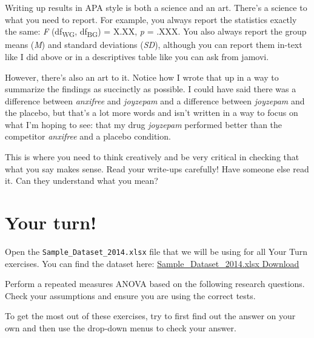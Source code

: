 \documentclass[
]{book}
\begin{document}
Writing up results in APA style is both a science and an art. There's a science to what you need to report. For example, you always report the statistics exactly the same: \emph{F} (df\textsubscript{WG}, df\textsubscript{BG}) = X.XX, \emph{p} = .XXX. You also always report the group means (\emph{M}) and standard deviations (\emph{SD}), although you can report them in-text like I did above or in a descriptives table like you can ask from jamovi.

However, there's also an art to it. Notice how I wrote that up in a way to summarize the findings as succinctly as possible. I could have said there was a difference between \emph{anxifree} and \emph{joyzepam} and a difference between \emph{joyzepam} and the placebo, but that's a lot more words and isn't written in a way to focus on what I'm hoping to see: that my drug \emph{joyzepam} performed better than the competitor \emph{anxifree} and a placebo condition.

This is where you need to think creatively and be very critical in checking that what you say makes sense. Read your write-ups carefully! Have someone else read it. Can they understand what you mean?

\hypertarget{your-turn-5}{%
\section{Your turn!}\label{your-turn-5}}

Open the \texttt{Sample\_Dataset\_2014.xlsx} file that we will be using for all Your Turn exercises. You can find the dataset here: \href{https://github.com/danawanzer/stats-with-jamovi/blob/master/data/Sample_Dataset_2014.xlsx}{Sample\_Dataset\_2014.xlsx Download}

Perform a repeated measures ANOVA based on the following research questions. Check your assumptions and ensure you are using the correct tests.

To get the most out of these exercises, try to first find out the answer on your own and then use the drop-down menus to check your answer.
\end{document}
